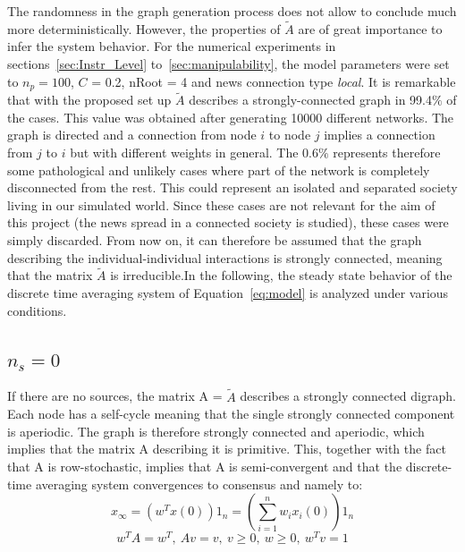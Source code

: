 The randomness in the graph generation process does not allow to conclude much more deterministically. However, the properties of $\tilde{A}$ are of great importance to infer the system behavior.
For the numerical experiments in
sections~\ref{sec:Instr_Level} to~\ref{sec:manipulability}, the model parameters were set to $n_p = 100$, $C$ = 0.2, nRoot = 4 and news connection type \textit{local}. It is remarkable that with the proposed set up $\tilde{A}$ describes a strongly-connected graph in 99.4$\%$ of the cases. This value was obtained after generating 10000 different networks.
 The graph is directed and a connection from node $i$ to node $j$ implies a connection from $j$ to $i$ but with different weights in general. The 0.6$\%$ represents therefore some pathological and unlikely cases where part of the network is completely disconnected from the rest. This could represent an isolated and separated society living in our simulated world. Since these cases are not relevant for the aim of this project (the news spread in a connected society is studied), these cases were simply discarded. From now on, it can therefore be assumed that the graph describing the individual-individual interactions is strongly connected, meaning that the matrix $\tilde{A}$ is irreducible.\newline In the following, the steady state behavior of the discrete time averaging system of Equation~\eqref{eq:model}
is analyzed under various conditions.

\subsection{$n_s = 0$}
If there are no sources, the matrix A = $\tilde{A}$ describes a strongly connected digraph. Each node has a self-cycle meaning that the single strongly connected component is aperiodic. The graph is therefore strongly connected and aperiodic, which implies that the matrix A describing it is primitive. This, together with the fact that A is row-stochastic, implies that A is semi-convergent and that the discrete-time averaging system convergences to consensus and namely to:
$$
x_{\infty} = (w^Tx(0))1_n = \left(\sum_{i=1}^{n}w_ix_i(0)\right)1_n
$$
$$
w^TA = w^T,\ 
Av = v,\ 
v \geq 0,\ w \geq 0,\ w^Tv = 1
$$
